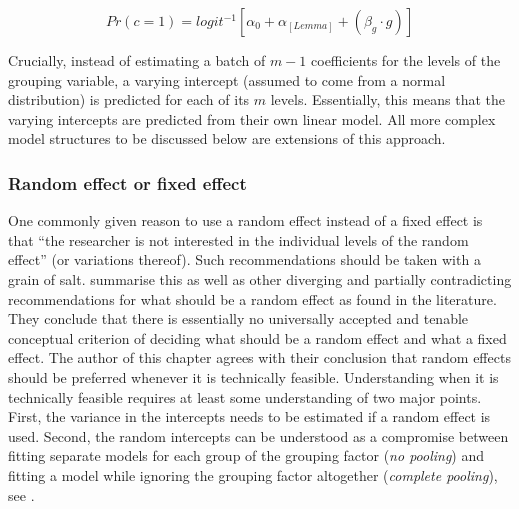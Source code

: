 \begin{equation}
  Pr(c=1)=logit^{-1}\left[\alpha_0+\alpha_{[Lemma]}+(\beta_{g}\cdot g)\right]
  \label{eq:002a}
\end{equation}

Crucially, instead of estimating a batch of $m-1$ coefficients for the levels of the grouping variable, a varying intercept (assumed to come from a normal distribution) is predicted for each of its $m$ levels.
Essentially, this means that the varying intercepts are predicted from their own linear model.
All more complex model structures to be discussed below are extensions of this approach.

\subsubsection{Random effect or fixed effect}
\label{sec:choosingbetweenrandomandfixedeffects}

One commonly given reason to use a random effect instead of a fixed effect is that ``the researcher is not interested in the individual levels of the random effect'' (or variations thereof).
Such recommendations should be taken with a grain of salt.
\citet[245--247]{GelmanHill2006} summarise this as well as other diverging and partially contradicting recommendations for what should be a random effect as found in the literature.
They conclude that there is essentially no universally accepted and tenable conceptual criterion of deciding what should be a random effect and what a fixed effect.
The author of this chapter agrees with their conclusion that random effects should be preferred whenever it is technically feasible.
Understanding when it is technically feasible requires at least some understanding of two major points.
First, the variance in the intercepts needs to be estimated if a random effect is used.
Second, the random intercepts can be understood as a compromise between fitting separate models for each group of the grouping factor (\textit{no pooling}) and fitting a model while ignoring the grouping factor altogether (\textit{complete pooling}), see \citet[Ch.~12]{GelmanHill2006}.

